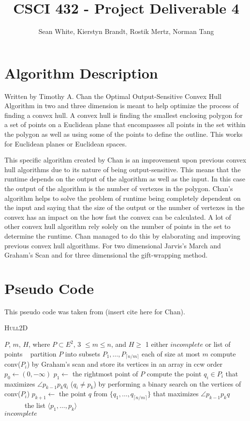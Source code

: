 \documentclass[12pt]{article}
\author{Sean White, Kierstyn Brandt, Rostik Mertz, Norman Tang}
\title{CSCI 432 - Project Deliverable 4}
\begin{document}
\maketitle

\section*{Algorithm Description}
Written by Timothy A. Chan the Optimal Output-Sensitive Convex Hull Algorithm in two and three dimension is meant to help optimize the process of finding a convex hull. A convex hull is finding the smallest enclosing polygon for a set of points on a Euclidean plane that encompasses all points in the set within the polygon as well as using some of the points to define the outline. This works for Euclidean planes or Euclidean spaces. 

This specific algorithm created by Chan is an improvement upon previous convex hull algorithms due to its nature of being output-sensitive. This means that the runtime depends on the output of the algorithm as well as the input. In this case the output of the algorithm is the number of vertexes in the polygon. Chan's algorithm helps to solve the problem of runtime being completely dependent on the input and saying that the size of the output or the number of vertexes in the convex has an impact on the how fast the convex can be calculated. A lot of other convex hull algorithm rely solely on the number of points in the set to determine the runtime. Chan managed to do this by elaborating and improving previous convex hull algorithms. For two dimensional Jarvis's March and Graham's Scan and for three dimensional the gift-wrapping method. 
\bigskip
\section*{Pseudo Code}
This pseudo code was taken from (insert cite here for Chan). 
\begin{algorithm}[H]\caption{\textsc{Hull2D}}\label{alg:2D}
\begin{algorithmic}[1]
 $P$, $m$, $H$, where $P\subset E^2$, 3 $\leq m \leq n$, and $H\geq$ 1
 either $incomplete$ or list of points
\State ~
\State partition $P$ into subsets $P_1,\dots , P_{\lceil n/m \rceil}$ each of size at most $m$
	\State compute conv($P_i$) by Graham's scan and store its vertices in an array in ccw order
\EndFor
\State $p_0 \gets (0,-\infty)$
\State $p_1 \gets$ the rightmost point of $P$
\State compute the point $q_i \in P_i$ that maximizes $\angle p_{k-1}p_kq_i$ ($q_i \neq p_k$) by performing a binary search on the vertices of conv($P_i$)
\EndFor
\State $p_{k+1} \gets$ the point $q$ from $\{q_1, \dots, q_{\lceil n/m \rceil}\}$ that maximizes $\angle p_{k-1}p_kq$
\\
~~~~~~\Return the list $\langle p_1, \dots ,p_k \rangle$
\EndIf
\EndFor\\
\Return $incomplete$
 \end{algorithmic}
\end{algorithm}
\end{document}
